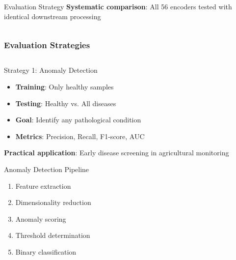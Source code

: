 \documentclass[aspectratio=43]{beamer}
\begin{document}
\begin{frame}
\begin{columns}
\begin{column}{0.5\textwidth}
            \begin{block}{Evaluation Strategy}
                \textbf{Systematic comparison}: All 56 encoders tested with identical downstream processing
            \end{block}
        \end{column}
    \end{columns}
\end{frame}

\begin{frame}
    \frametitle{Evaluation Strategies}
    
    \begin{columns}
        \begin{column}{0.5\textwidth}
            \begin{block}{Strategy 1: Anomaly Detection}
                \begin{itemize}
                    \item \textbf{Training}: Only healthy samples
                    \item \textbf{Testing}: Healthy vs. All diseases
                    \item \textbf{Goal}: Identify any pathological condition
                    \item \textbf{Metrics}: Precision, Recall, F1-score, AUC
                \end{itemize}
                
                \vspace{0.3cm}
                \textbf{Practical application}: Early disease screening in agricultural monitoring
            \end{block}
            
            \begin{exampleblock}{Anomaly Detection Pipeline}
                \begin{enumerate}
                    \item Feature extraction
                    \item Dimensionality reduction
                    \item Anomaly scoring
                    \item Threshold determination
                    \item Binary classification
                \end{enumerate}
            \end{exampleblock}
        \end{column}
        

\end{columns}
\end{frame}
\end{document}
